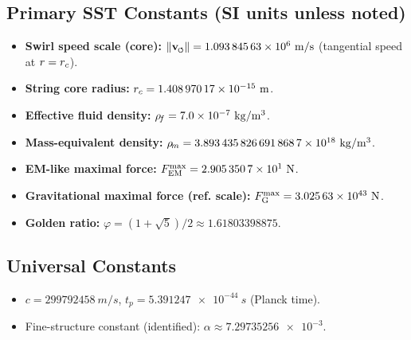 \documentclass[11pt]{article}
\begin{document}
\subsection*{Primary SST Constants (SI units unless noted)}
    \begin{itemize}
    \item \textbf{Swirl speed scale (core):} $\vnorm = \num{1.09384563e6}\ \si{m/s}$ (tangential speed at $r=\rc$).
    \item \textbf{String core radius:} $\rc = \num{1.40897017e-15}\ \si{m}$.
    \item \textbf{Effective fluid density:} $\rhof = \num{7.0e-7}\ \si{kg/m^3}$.
    \item \textbf{Mass-equivalent density:} $\rhom = \num{3.8934358266918687e18}\ \si{kg/m^3}$.
    \item \textbf{EM-like maximal force:} $\FmaxEM = \num{2.9053507e1}\ \si{N}$.
    \item \textbf{Gravitational maximal force (ref. scale):} $\FmaxG = \num{3.02563e43}\ \si{N}$.
    \item \textbf{Golden ratio:} $\varphi = (1+\sqrt{5})/2 \approx \num{1.61803398875}$.
    \end{itemize}

\subsection*{Universal Constants}
    \begin{itemize}
    \item $c=\num{299792458}\ \si{m/s}$, \quad $t_p=\num{5.391247e-44}\ \si{s}$ (Planck time).
    \item Fine-structure constant (identified): $\alpha \approx \num{7.29735256e-3}$.
    \end{itemize}
\end{document}
